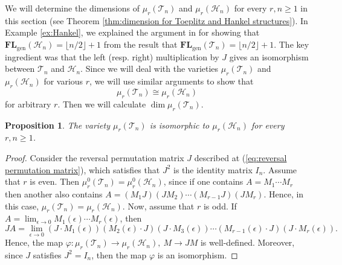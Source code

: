 \documentclass[reqno]{amsart}
\newtheorem{proposition}[theorem]{Proposition}
\theoremstyle{definition}
\numberwithin{equation}{section}
\begin{document}
We will determine the dimensions of $\mu_r(\mathcal{T}_n)$ and $\mu_r(\mathcal{H}_n)$ for every $r,n \geq 1$ in this section (see Theorem \ref{thm:dimension for Toeplitz and Hankel structures}). In Example \ref{ex:Hankel}, we explained the argument in \cite{ye2016every} for showing that $\mathbf{FL}_{\text{gen}}(\mathcal{H}_n)=\lfloor n/2 \rfloor+1$ from the result that  $\mathbf{FL}_{\text{gen}}(\mathcal{T}_n)=\lfloor n/2 \rfloor+1$. The key ingredient was that the left (resp. right) multiplication by $J$ gives an isomorphism between $\mathcal{T}_n$ and $\mathcal{H}_n$. Since we will deal with the varieties $\mu_r(\mathcal{T}_n)$ and $\mu_r(\mathcal{H}_n)$ for various $r$, we will use similar arguments to show that
    \begin{equation*}
        \mu_r(\mathcal{T}_n)\cong\mu_r(\mathcal{H}_n)
    \end{equation*}
for arbitrary $r$. Then we will calculate $\dim \mu_r(\mathcal{T}_n)$.

\begin{proposition}\label{prop:isomorphism between Toeplitz and Hankel factorization varieties}
    The variety $\mu_r(\mathcal{T}_n)$ is isomorphic to $\mu_r(\mathcal{H}_n)$ for every $r,n \geq 1$.
\end{proposition}

\begin{proof}
    Consider the reversal permutation matrix $J$ described at (\ref{eq:reversal permutation matrix}), which satisfies that $J^2$ is the identity matrix $I_n$. Assume that $r$ is even. Then $\mu_r^0(\mathcal{T}_n)=\mu_r^0(\mathcal{H}_n)$, since if one contains $A=M_1\cdots M_r$ then another also contains $A=(M_1J)(JM_2)\cdots (M_{r-1}J)(JM_r)$. Hence, in this case, $\mu_r(\mathcal{T}_n)=\mu_r(\mathcal{H}_n)$. Now, assume that $r$ is odd. If $A=\lim_{\epsilon \rightarrow 0}M_1(\epsilon)\cdots M_r(\epsilon)$, then 
    \begin{equation*}
        JA=\lim_{\epsilon \rightarrow 0}(J\cdot M_1(\epsilon))(M_2(\epsilon)\cdot J)(J\cdot M_3(\epsilon))\cdots(M_{r-1}(\epsilon)\cdot J)(J\cdot M_r(\epsilon)).
    \end{equation*}
    Hence, the map $\varphi:\mu_r(\mathcal{T}_n) \rightarrow \mu_r(\mathcal{H}_n), ~M \rightarrow JM$ is well-defined. Moreover, since $J$ satisfies $J^2=I_n$, then the map $\varphi$ is an isomorphism.
\end{proof}
\end{document}
